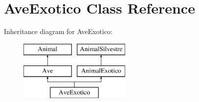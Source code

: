 \hypertarget{class_ave_exotico}{}\section{Ave\+Exotico Class Reference}
\label{class_ave_exotico}
Inheritance diagram for Ave\+Exotico\+:\begin{figure}[H]
\begin{center}
\leavevmode
\includegraphics[height=3.000000cm]{class_ave_exotico}
\end{center}
\end{figure}
